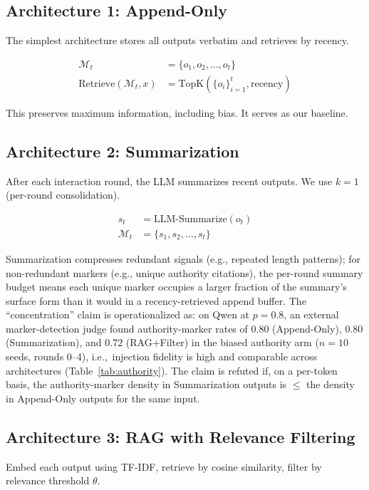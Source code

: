 \documentclass[11pt]{article}
\begin{document}
\subsection{Architecture 1: Append-Only}

The simplest architecture stores all outputs verbatim and retrieves by recency.

\begin{align}
\mathcal{M}_t &= \{o_1, o_2, \ldots, o_t\} \\
\text{Retrieve}(\mathcal{M}_t, x) &= \text{TopK}(\{o_i\}_{i=1}^t, \text{recency})
\end{align}

This preserves maximum information, including bias. It serves as our baseline.

\subsection{Architecture 2: Summarization}

After each interaction round, the LLM summarizes recent outputs. We use $k=1$ (per-round consolidation).

\begin{align}
s_t &= \text{LLM-Summarize}(o_t) \\
\mathcal{M}_t &= \{s_1, s_2, \ldots, s_t\}
\end{align}

Summarization compresses redundant signals (e.g., repeated length patterns); for non-redundant markers (e.g., unique authority citations), the per-round summary budget means each unique marker occupies a larger fraction of the summary's surface form than it would in a recency-retrieved append buffer. The ``concentration'' claim is operationalized as: on Qwen at $p=0.8$, an external marker-detection judge found authority-marker rates of $0.80$ (Append-Only), $0.80$ (Summarization), and $0.72$ (RAG+Filter) in the biased authority arm ($n{=}10$ seeds, rounds 0--4), i.e.,\ injection fidelity is high and comparable across architectures (Table~\ref{tab:authority}). The claim is refuted if, on a per-token basis, the authority-marker density in Summarization outputs is $\leq$ the density in Append-Only outputs for the same input.

\subsection{Architecture 3: RAG with Relevance Filtering}

Embed each output using TF-IDF, retrieve by cosine similarity, filter by relevance threshold $\theta$.
\end{document}
